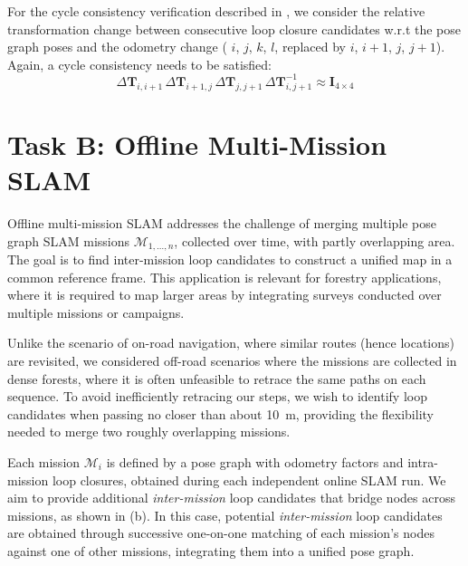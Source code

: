 For the cycle consistency verification described in , we consider the relative transformation change between consecutive loop closure candidates w.r.t the pose graph poses and the odometry change (  $i$, $j$, $k$, $l$, replaced by ${i}$, ${i+1}$, ${j}$, ${j+1}$). Again, a cycle consistency needs to be satisfied:
\begin{equation}
  \label{eq:cycle-online}
  \Delta\mathbf{T}_{i,i+1}\, \Delta\mathbf{T}_{i+1, j}\, \Delta\mathbf{T}_{j, j+1}\, \Delta\mathbf{T}_{i, j+1}^{-1} \approx \mathbf{I}_{4\times4}
\end{equation}
\section{Task B: Offline Multi-Mission SLAM}\label{sec:offline}
Offline multi-mission SLAM addresses the challenge of merging multiple pose graph SLAM missions ${\mathcal{M}_{1, \ldots, n}}$, collected over time, with partly overlapping area. 
The goal is to find inter-mission loop candidates to construct a unified map in a common reference frame. This application is relevant for forestry applications, where it is required to map larger areas by integrating surveys conducted over multiple missions or campaigns.

Unlike the scenario of on-road navigation, where similar routes (hence locations) are revisited, we considered off-road scenarios where the missions are collected in dense forests, where it is often unfeasible to retrace the same paths on each sequence. To avoid inefficiently retracing our steps, we wish to identify loop candidates when passing no closer than about \SI{10}{\meter}, providing the flexibility needed to merge two roughly overlapping missions.

Each mission ${\mathcal{M}_{i}}$ is defined by a pose graph with odometry factors and intra-mission loop closures, obtained during each independent online SLAM run. We aim to provide additional \emph{inter-mission} loop candidates that bridge nodes across missions, as shown in  (b). In this case, potential \emph{inter-mission} loop candidates are obtained through successive one-on-one matching of each mission's nodes against one of other missions, integrating them into a unified pose graph.

